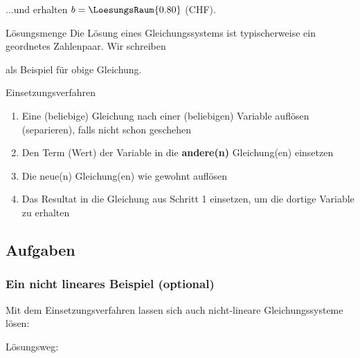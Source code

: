 
...und erhalten $b = \LoesungsRaum{0.80}$ (CHF).


\newpage

  \begin{gesetz}{Lösungsmenge}{}
    Die Lösung eines Gleichungssystems ist typischerweise ein
    geordnetes Zahlenpaar. Wir schreiben 


  als Beispiel für obige Gleichung.
    
    \end{gesetz}


  \begin{rezept}{Einsetzungsverfahren}{}
  \begin{enumerate}

  \item Eine (beliebige) Gleichung nach einer (beliebigen) Variable
    auf\/lösen (separieren), falls nicht schon geschehen
  \item Den Term (Wert) der Variable in die \textbf{andere(n)}
    Gleichung(en) einsetzen
  \item Die neue(n) Gleichung(en) wie gewohnt auf\/lösen
  \item Das Resultat in die Gleichung aus Schritt 1 einsetzen,
    um die dortige Variable zu erhalten
  \end{enumerate}
\end{rezept}


\subsection*{Aufgaben}
\newpage
  
\subsubsection{Ein nicht lineares Beispiel (optional)}
Mit dem Einsetzungsverfahren lassen sich auch nicht-lineare
Gleichungssysteme lösen:

Lösungsweg:

